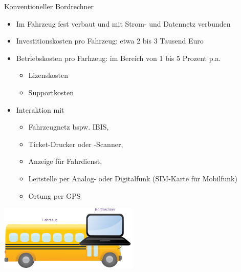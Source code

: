 
\begin{frame}{Konventioneller Bordrechner}
  \begin{itemize}
  \item Im Fahrzeug fest verbaut und mit Strom- und Datennetz verbunden
  \item Investitionskosten pro Fahrzeug: etwa 2 bis 3 Tausend Euro
  \item Betriebskosten pro Farhzeug: im Bereich von 1 bis 5 Prozent p.a.
    \begin{itemize}
    \item Lizenskosten
    \item Supportkosten
    \end{itemize}
  \item Interaktion mit
    \begin{itemize}
    \item Fahrzeugnetz bspw. IBIS,
    \item Ticket-Drucker oder -Scanner,
    \item Anzeige für Fahrdienst,
    \item Leitstelle per Analog- oder Digitalfunk (SIM-Karte für Mobilfunk)
    \item Ortung per GPS
    \end{itemize}
  \end{itemize}
  \includegraphics[width=0.5\textwidth]{public-transport/bus.png}
\end{frame}

